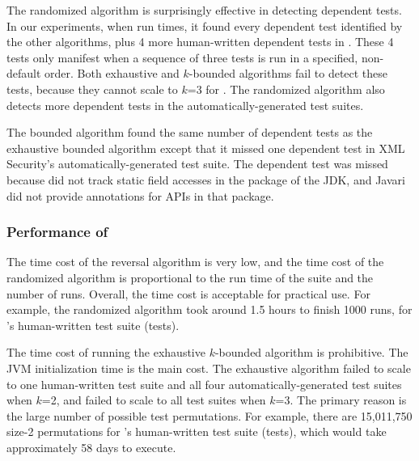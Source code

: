 The randomized algorithm is surprisingly effective in
detecting dependent tests. In our experiments, when run \trialnum times,
it found every
dependent test identified by the other algorithms, plus 
4 more human-written dependent
tests in \jt. These 4 tests only
manifest when a sequence of three tests is run in a specified,
non-default order. Both exhaustive and \dependenceaware{} $k$-bounded
algorithms fail to detect these tests, because
they cannot scale to $k$=3 for 
\jt.  The randomized algorithm also
detects more dependent
tests in the automatically-generated test suites.

The \dependenceaware{} bounded algorithm found the same
number of dependent tests as the exhaustive bounded algorithm
except that it missed one dependent test in XML Security's
automatically-generated test suite.
The dependent test was missed because \ourtool
did not track static field accesses in the  package
of the JDK, and Javari did not provide annotations for APIs
in that package.


\subsubsection{Performance of \ourtool}
\label{sec:performance}

The time cost of the reversal algorithm is very low, and
the time cost of the randomized algorithm 
is proportional to the run time of the suite and the number of runs.
Overall, the time cost is acceptable for practical use.
For example, the randomized algorithm took around 1.5 hours
to finish 1000 runs,  for \jt's human-written test
suite (\jodatimetests tests).
 
The time cost of running the exhaustive $k$-bounded algorithm
is prohibitive. The JVM initialization time is the main cost.
The exhaustive algorithm failed to
scale to one human-written test suite and all four automatically-generated
test suites when $k$=2, and failed to scale to all test suites
when $k$=3. The primary reason is the large
number of possible test permutations. 
For example, there are 15,011,750 size-2 permutations
for \jt's human-written test suite (\jodatimetests tests),
which would take approximately 58 days to execute.

